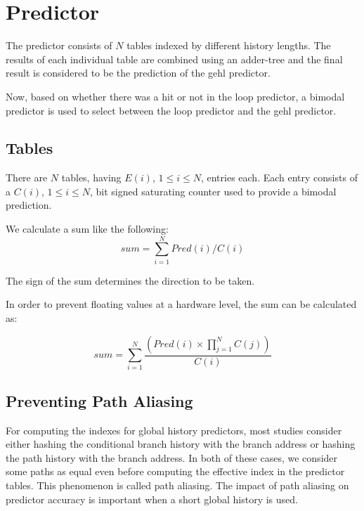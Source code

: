\documentclass{sig-alternate}
\begin{document}
\section{Predictor}
\label{sec-predictor}

The predictor consists of $N$ tables indexed by different history lengths.
The results of each individual table are combined using an adder-tree and
the final result is considered to be the prediction of the gehl predictor.

Now, based on whether there was a hit or not in the loop predictor, a bimodal
predictor is used to select between the loop predictor and the gehl predictor.

\subsection{Tables}

There are $N$ tables, having $E(i)$, $1 \leq i \leq N$, entries each. Each entry
consists of a $C(i)$, $1 \leq i \leq N$, bit signed saturating counter used to provide a
bimodal prediction.

We calculate a sum like the following:
\begin{equation}
  sum = \sum_{i=1}^{N} Pred(i) / C(i)
\end{equation}

The sign of the sum determines the direction to be taken.

In order to prevent floating values at a hardware level, the sum can be
calculated as:

\begin{equation}
  sum = \sum_{i=1}^{N} \frac{\left( Pred(i) \times {\displaystyle \prod_{j=1}^{N}C(j)} \right)}{C(i)}
\end{equation}

\subsection{Preventing Path Aliasing}

For computing the indexes for global history predictors,
most studies consider either hashing the conditional branch
history with the branch address or hashing the path history
with the branch address. In both of these cases, we consider
some paths as equal even before computing the effective
index in the predictor tables. This phenomenon is called path aliasing.
The impact of path aliasing on predictor
accuracy is important when a short global
history is used.
\end{document}
